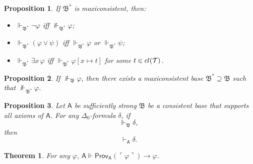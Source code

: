 \documentclass[10pt,a4paper]{amsart}
\newtheorem{proposition}{Proposition}
\newtheorem{theorem}{Theorem}
\newcommand{\Prov}{\textsf{Prov}}
\newcommand{\base}[1]{\mathfrak{#1}}
\newcommand{\closure}{\textsc{cl}}
\newcommand{\mbase}[1]{{\mathfrak{#1}^\ast}}
\newcommand{\pa}{\textsf{A}}
\newcommand{\proves}{\vdash}
\newcommand{\setClosedTerm}{\closure(\setTerm)}
\newcommand{\setTerm}{\mathcal{T}}
\newcommand{\supp}{\Vdash}
\begin{document}
\begin{proposition}\label{prop:maxiconsistent-disjunction}
If $\mbase{B}$ is maxiconsistent, then:
\begin{itemize}
    \item $\supp_{\mbase{B}} \neg \varphi$ iff $\not\supp_{\mbase{B}} \varphi$;
    \item $\supp_{\mbase{B}} (\varphi \lor \psi)$ iff $\supp_{\mbase{B}} \varphi$
        or $\supp_{\mbase{B}} \psi$;
    \item $\supp_{\mbase{B}} \exists x\,\varphi$ iff $\supp_{\mbase{B}}
        \varphi[x \mapsto t]$ for some $t \in \setClosedTerm$.
\end{itemize}
\end{proposition}

\begin{proposition}\label{prop:maxiconsistent-extension}
If $\not\supp_{\base{B}} \varphi$, then 
there exists a maxiconsistent base $\mbase{B} \supseteq \base{B}$ 
such that $\not\supp_{\mbase{B}} \varphi$.
\end{proposition}

\begin{proposition}\label{prop:equationally-complete}
    Let $\pa$ be sufficiently strong $\base{B}$ be a consistent base that supports all
axioms of $\pa$. For any $\Delta_0$-formula $\delta$, if
\[
    \supp_{\base{B}} \delta,
\]
then
\[
    \proves_{\pa} \delta.
\] 
\end{proposition}

\begin{theorem}\label{thm:reflection}
    For any $\varphi$, $\pa \supp \Prov_{\pa}(\ulcorner \varphi \urcorner) \to \varphi$.
\end{theorem}
\end{document}
